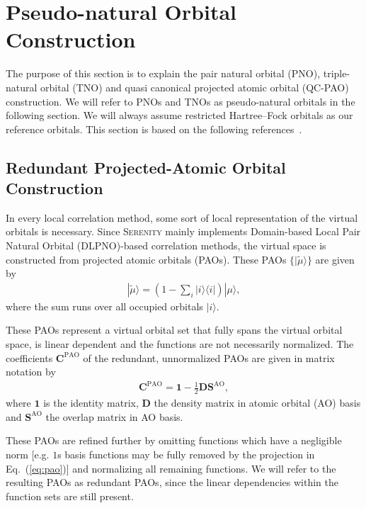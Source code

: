 \section{Pseudo-natural Orbital Construction}
The purpose of this section is to explain the pair natural orbital (PNO), triple-natural orbital (TNO) and
quasi canonical projected atomic orbital (QC-PAO) construction. We will refer to PNOs and TNOs as pseudo-natural
orbitals in the following section. We will always assume restricted Hartree--Fock orbitals as our reference orbitals.
This section is based on the following references~\cite{Pulay1983,Neese2009b,Riplinger2013a}.

\subsection{Redundant Projected-Atomic Orbital Construction}
In every local correlation method, some sort of local representation of the virtual orbitals is necessary.
Since \textsc{Serenity} mainly implements Domain-based Local Pair Natural Orbital (DLPNO)-based correlation
methods, the virtual space is constructed from projected atomic orbitals (PAOs).
These PAOs $\{|\tilde{\mu}\rangle\}$ are given by
\begin{align}
  |\tilde{\mu}\rangle = \left(1-\sum_{i} |i\rangle\langle i|\right)|\mu\rangle,
  \label{eq:pao}
\end{align}
where the sum runs over all occupied orbitals $|i\rangle$.

These PAOs represent a virtual orbital set that fully spans the virtual orbital space, is linear dependent
and the functions are not necessarily normalized.
The coefficients $\pmb{C}^{\mathrm{PAO}}$ of the redundant, unnormalized PAOs are given in matrix
notation by
\begin{align}
  \pmb{C}^{\mathrm{PAO}} = \pmb{1}-\frac{1}{2} \pmb{D}\pmb{S}^\mathrm{AO},
\end{align}
where $\pmb{1}$ is the identity matrix, $\pmb{D}$ the density matrix in atomic orbital (AO) basis and
$\pmb{S}^\mathrm{AO}$ the overlap matrix in AO basis.

These PAOs are refined further by omitting functions which have a negligible norm
[e.g. $1$s basis functions may be fully removed by the projection in Eq.~(\ref{eq:pao})]
and normalizing all remaining functions.
We will refer to the resulting PAOs as redundant PAOs, since the linear dependencies within the function
sets are still present.

